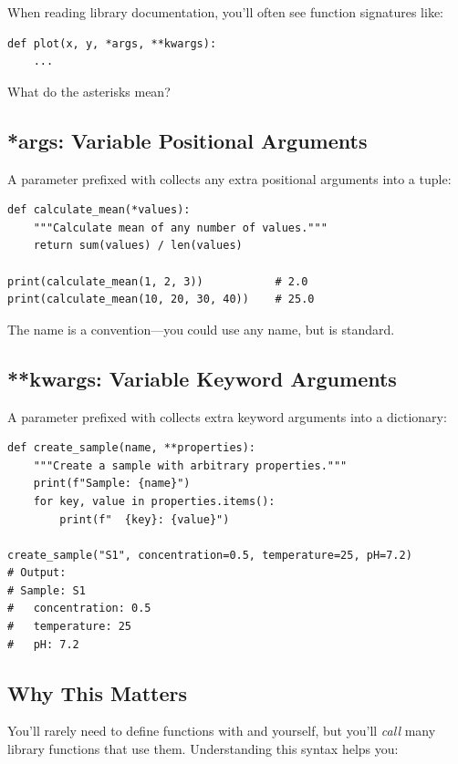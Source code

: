 When reading library documentation, you'll often see function signatures like:

\begin{lstlisting}
def plot(x, y, *args, **kwargs):
    ...
\end{lstlisting}

What do the asterisks mean?

\subsection{*args: Variable Positional Arguments}

A parameter prefixed with \py{*} collects any extra positional arguments into a tuple:

\begin{lstlisting}
def calculate_mean(*values):
    """Calculate mean of any number of values."""
    return sum(values) / len(values)

print(calculate_mean(1, 2, 3))           # 2.0
print(calculate_mean(10, 20, 30, 40))    # 25.0
\end{lstlisting}

The name  is a convention---you could use any name, but  is standard.

\subsection{**kwargs: Variable Keyword Arguments}

A parameter prefixed with \py{**} collects extra keyword arguments into a dictionary:

\begin{lstlisting}
def create_sample(name, **properties):
    """Create a sample with arbitrary properties."""
    print(f"Sample: {name}")
    for key, value in properties.items():
        print(f"  {key}: {value}")

create_sample("S1", concentration=0.5, temperature=25, pH=7.2)
# Output:
# Sample: S1
#   concentration: 0.5
#   temperature: 25
#   pH: 7.2
\end{lstlisting}

\subsection{Why This Matters}

You'll rarely need to define functions with  and  yourself, but you'll \emph{call} many library functions that use them. Understanding this syntax helps you:

